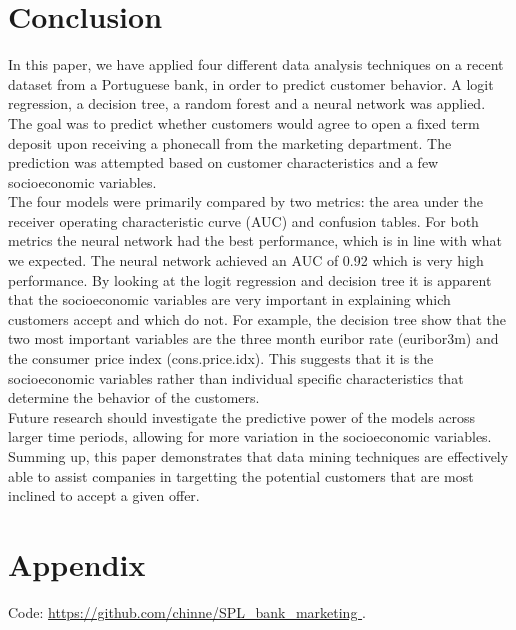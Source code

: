  \section{Conclusion}
 \noindent In this paper, we have applied four different data analysis techniques on a recent dataset from a Portuguese bank, in order to predict customer behavior. A logit regression, a decision tree, a random forest and a neural network was applied. The goal was to predict whether customers would agree to open a fixed term deposit upon receiving a phonecall from the marketing department. The prediction was attempted based on customer characteristics and a few socioeconomic variables.\\
 The four models were primarily compared by two metrics: the area under the receiver operating characteristic curve (AUC) and confusion tables. For both metrics the neural network had the best performance, which is in line with what we expected. The neural network achieved an AUC of 0.92 which is very high performance. By looking at the logit regression and decision tree it is apparent that the socioeconomic variables are very important in explaining which customers accept and which do not. For example, the decision tree show that the two most important variables are the three month euribor rate (euribor3m) and the consumer price index (cons.price.idx). This suggests that it is the socioeconomic variables rather than individual specific characteristics that determine the behavior of the customers.\\
 Future research should investigate the predictive power of the models across larger time periods, allowing for more variation in the socioeconomic variables.\\
 Summing up, this paper demonstrates that data mining techniques are effectively able to assist companies in targetting the potential customers that are most inclined to accept a given offer. 
 \newpage
\pagestyle{fancy}



\newpage
\pagestyle{fancy}
    \section*{Appendix}
 \noindent Code:  \url{https://github.com/chinne/SPL_bank_marketing 
}.\\

 

